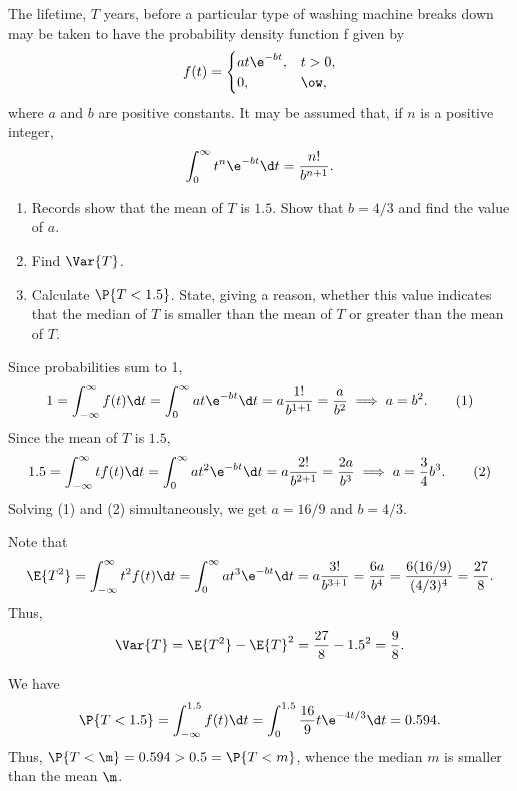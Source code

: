 \begin{problem}
    The lifetime, $T$ years, before a particular type of washing machine breaks down may be taken to have the probability density function f given by \[f(t) = \begin{cases}
        at \e^{-bt}, & t > 0,\\
        0, & \ow,
    \end{cases}\] where $a$ and $b$ are positive constants. It may be assumed that, if $n$ is a positive integer, \[\int_0^\infty t^n \e^{-bt} \d t = \frac{n!}{b^{n+1}}.\]

    \begin{enumerate}
        \item Records show that the mean of $T$ is $1.5$. Show that $b=4/3$ and find the value of $a$.
        \item Find $\Var{T}$.
        \item Calculate $\P{T<1.5}$. State, giving a reason, whether this value indicates that the median of $T$ is smaller than the mean of $T$ or greater than the mean of $T$.
    \end{enumerate}
\end{problem}
\begin{solution}
    \begin{ppart}
        Since probabilities sum to 1, \[1 = \int_{-\infty}^\infty f(t) \d t = \int_0^\infty a t \e^{-bt} \d t = a \frac{1!}{b^{1+1}} = \frac{a}{b^2} \implies a = b^2. \tag{1}\] Since the mean of $T$ is $1.5$, \[1.5 = \int_{-\infty}^\infty t f(t) \d t = \int_0^\infty a t^2 \e^{-bt} \d t = a \frac{2!}{b^{2+1}} = \frac{2a}{b^3} \implies a = \frac34 b^3. \tag{2}\] Solving (1) and (2) simultaneously, we get $a = 16/9$ and $b = 4/3$.
    \end{ppart}
    \begin{ppart}
        Note that \[\E{T^2} = \int_{-\infty}^\infty t^2 f(t) \d t = \int_0^\infty a t^3 \e^{-bt} \d t = a \frac{3!}{b^{3+1}} = \frac{6a}{b^4} = \frac{6(16/9)}{(4/3)^4} = \frac{27}{8}.\] Thus, \[\Var{T} = \E{T^2} -\E{T}^2 = \frac{27}{8} - 1.5^2 = \frac98.\]
    \end{ppart}
    \begin{ppart}
        We have \[\P{T < 1.5} = \int_{-\infty}^{1.5} f(t) \d t = \int_0^{1.5} \frac{16}9 t\e^{-4t/3} \d t = 0.594.\] Thus, $\P{T < \m} = 0.594 > 0.5 = \P{T < m}$, whence the median $m$ is smaller than the mean $\m$.
    \end{ppart}
\end{solution}

